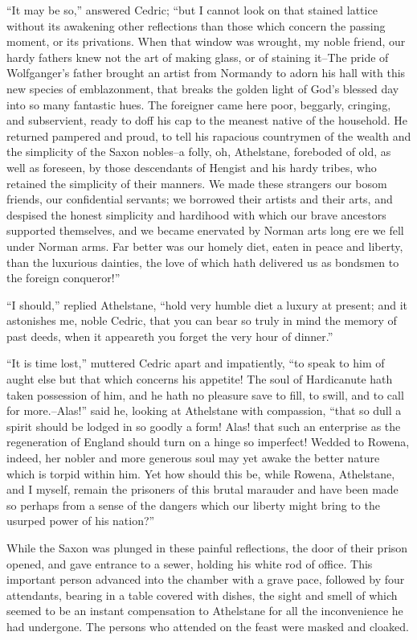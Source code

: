 ``It may be so,'' answered Cedric; ``but I cannot look on that stained
lattice without its awakening other reflections than those which concern
the passing moment, or its privations. When that window was wrought, my
noble friend, our hardy fathers knew not the art of making glass, or of
staining it--The pride of Wolfganger's father brought an artist from
Normandy to adorn his hall with this new species of emblazonment, that
breaks the golden light of God's blessed day into so many fantastic
hues. The foreigner came here poor, beggarly, cringing, and subservient,
ready to doff his cap to the meanest native of the household. He
returned pampered and proud, to tell his rapacious countrymen of the
wealth and the simplicity of the Saxon nobles--a folly, oh, Athelstane,
foreboded of old, as well as foreseen, by those descendants of Hengist
and his hardy tribes, who retained the simplicity of their manners. We
made these strangers our bosom friends, our confidential servants; we
borrowed their artists and their arts, and despised the honest
simplicity and hardihood with which our brave ancestors supported
themselves, and we became enervated by Norman arts long ere we fell
under Norman arms. Far better was our homely diet, eaten in peace and
liberty, than the luxurious dainties, the love of which hath delivered
us as bondsmen to the foreign conqueror!''

``I should,'' replied Athelstane, ``hold very humble diet a luxury at
present; and it astonishes me, noble Cedric, that you can bear so truly
in mind the memory of past deeds, when it appeareth you forget the very
hour of dinner.''

``It is time lost,'' muttered Cedric apart and impatiently, ``to speak
to him of aught else but that which concerns his appetite! The soul of
Hardicanute hath taken possession of him, and he hath no pleasure save
to fill, to swill, and to call for more.--Alas!'' said he, looking at
Athelstane with compassion, ``that so dull a spirit should be lodged in
so goodly a form! Alas! that such an enterprise as the regeneration of
England should turn on a hinge so imperfect! Wedded to Rowena, indeed,
her nobler and more generous soul may yet awake the better nature which
is torpid within him. Yet how should this be, while Rowena, Athelstane,
and I myself, remain the prisoners of this brutal marauder and have been
made so perhaps from a sense of the dangers which our liberty might
bring to the usurped power of his nation?''

While the Saxon was plunged in these painful reflections, the door of
their prison opened, and gave entrance to a sewer, holding his white rod
of office. This important person advanced into the chamber with a grave
pace, followed by four attendants, bearing in a table covered with
dishes, the sight and smell of which seemed to be an instant
compensation to Athelstane for all the inconvenience he had undergone.
The persons who attended on the feast were masked and cloaked.

